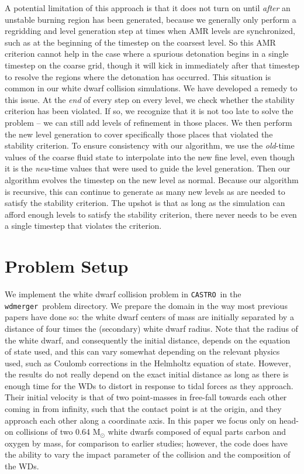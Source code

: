 \documentclass[twocolumn,numberedappendix]{../aastex6}
\newcommand{\msolar}{\mathrm{M}_\odot}
\newcommand{\castro}{\texttt{CASTRO}}
\newcommand{\wdmerger}{\texttt{wdmerger}}
\begin{document}
A potential limitation of this approach is that it does not turn on
until \textit{after} an unstable burning region has been generated,
because we generally only perform a regridding and level generation
step at times when AMR levels are synchronized, such as at the beginning
of the timestep on the coarsest level. So this AMR criterion cannot
help in the case where a spurious detonation begins in a single timestep
on the coarse grid, though it will kick in immediately after that
timestep to resolve the regions where the detonation has occurred.
This situation is common in our white dwarf collision simulations.
We have developed a remedy to this issue. At the \textit{end} of every step
on every level, we check whether the stability criterion has been violated.
If so, we recognize that it is not too late to solve the problem -- we can
still add levels of refinement in those places. We then perform the new level
generation to cover specifically those places that violated the stability criterion.
To ensure consistency with our algorithm, we use the \textit{old}-time values
of the coarse fluid state to interpolate into the new fine level, even
though it is the \textit{new}-time values that were used to guide the level
generation. Then our algorithm evolves the timestep on the new level as normal.
Because our algorithm is recursive, this can continue to generate
as many new levels as are needed to satisfy the stability criterion.
The upshot is that as long as the simulation can afford enough levels to
satisfy the stability criterion, there never needs to be even a single timestep
that violates the criterion.



\section{Problem Setup}
\label{sec:problemsetup}

We implement the white dwarf collision problem in \castro\ in the \wdmerger\ problem
directory. We prepare the domain in the way most previous papers have done so:
the white dwarf centers of mass are initially separated by a distance of four times
the (secondary) white dwarf radius. Note that the radius of the white dwarf, and
consequently the initial distance, depends on the equation of state used, and this
can vary somewhat depending on the relevant physics used, such as Coulomb corrections
in the Helmholtz equation of state. However, the results do not really depend on the
exact initial distance as long as there is enough time for the WDs to distort in
response to tidal forces as they approach. Their initial velocity is that of
two point-masses in free-fall towards each other coming in from infinity, such that
the contact point is at the origin, and they approach each other along a coordinate axis.
In this paper we focus only on head-on collisions of two 0.64 $\msolar$ white dwarfs
composed of equal parts carbon and oxygen by mass, for comparison to earlier studies;
however, the code does have the ability to vary the impact parameter of the collision
and the composition of the WDs.
\end{document}
